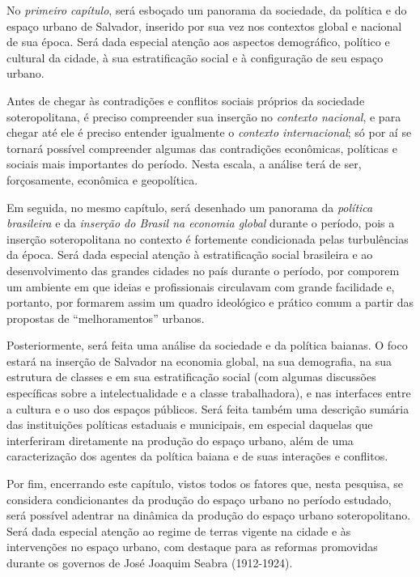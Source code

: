 No \textit{primeiro capítulo}, será esboçado um panorama da sociedade, da política e do espaço urbano de Salvador, inserido por sua vez nos contextos global e nacional de sua época. Será dada especial atenção aos aspectos demográfico, político e cultural da cidade, à sua estratificação social e à configuração de seu espaço urbano. 

Antes de chegar às contradições e conflitos sociais próprios da sociedade soteropolitana, é preciso compreender sua inserção no \textit{contexto nacional}, e para chegar até ele é preciso entender igualmente o \textit{contexto internacional}; só por aí se tornará possível compreender algumas das contradições econômicas, políticas e sociais mais importantes do período. Nesta escala, a análise terá de ser, forçosamente, econômica e geopolítica. 

Em seguida, no mesmo capítulo, será desenhado um panorama da \textit{política brasileira} e da \textit{inserção do Brasil na economia global} durante o período, pois a inserção soteropolitana no contexto é fortemente condicionada pelas turbulências da época. Será dada especial atenção à estratificação social brasileira e ao desenvolvimento das grandes cidades no país durante o período, por comporem um ambiente em que ideias e profissionais circulavam com grande facilidade e, portanto, por formarem assim um quadro ideológico e prático comum a partir das propostas de ``melhoramentos'' urbanos. 

Posteriormente, será feita uma análise da sociedade e da política baianas. O foco estará na inserção de Salvador na economia global, na sua demografia, na sua estrutura de classes e em sua estratificação social (com algumas discussões específicas sobre a intelectualidade e a classe trabalhadora), e nas interfaces entre a cultura e o uso dos espaços públicos. Será feita também uma descrição sumária das instituições políticas estaduais e municipais, em especial daquelas que interferiram diretamente na produção do espaço urbano, além de uma caracterização dos agentes da política baiana e de suas interações e conflitos. 

Por fim, encerrando este capítulo, vistos todos os fatores que, nesta pesquisa, se considera condicionantes da produção do espaço urbano no período estudado, será possível adentrar na dinâmica da produção do espaço urbano soteropolitano. Será dada especial atenção ao regime de terras vigente na cidade e às intervenções no espaço urbano, com destaque para as reformas promovidas durante os governos de José Joaquim Seabra (1912-1924). 

